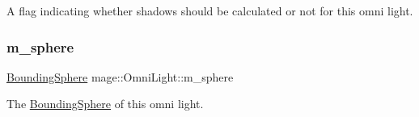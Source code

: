 A flag indicating whether shadows should be calculated or not for this omni light. \hypertarget{classmage_1_1_omni_light_a2588b65552978e3641f49f35dca381de}{}\label{classmage_1_1_omni_light_a2588b65552978e3641f49f35dca381de} 
\subsubsection{\texorpdfstring{m\+\_\+sphere}{m\_sphere}}
{\footnotesize\ttfamily \hyperlink{classmage_1_1_bounding_sphere}{Bounding\+Sphere} mage\+::\+Omni\+Light\+::m\+\_\+sphere\hspace{0.3cm}{\ttfamily [private]}}

The \hyperlink{classmage_1_1_bounding_sphere}{Bounding\+Sphere} of this omni light. 